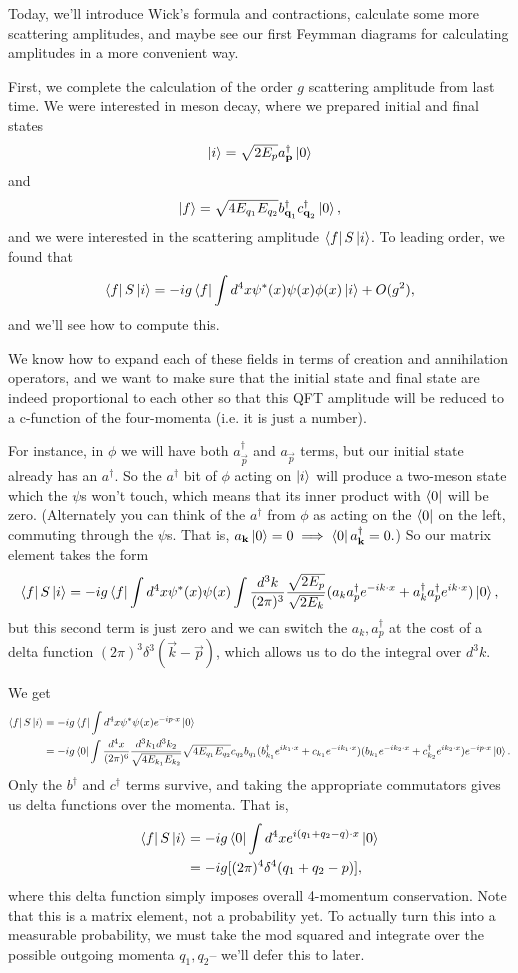 Today, we'll introduce Wick's formula and contractions, calculate some more scattering amplitudes, and maybe see our first Feymman diagrams for calculating amplitudes in a more convenient way.

First, we complete the calculation of the order $g$ scattering amplitude from last time. We were interested in meson decay, where we prepared initial and final states
$$\left| i \right>=\sqrt{2E_p}a_{\boldsymbol{\mathbf{p}}}^\dagger \left| 0 \right>$$
and
$$\left| f \right>=\sqrt{4E_{q_1}E_{q_2}}b_{\boldsymbol{\mathbf{q}}_1}^\dagger c_{\boldsymbol{\mathbf{q}}_2}^\dagger \left| 0 \right>,$$
and we were interested in the scattering amplitude $\left< f \right|S \left| i \right>$. To leading order, we found that
$$\left< f \right|S\left| i \right>=-ig \left< f \right|\int d^4 x \psi^* (x) \psi(x) \phi(x) \left| i \right> + O(g^2),$$
and we'll see how to compute this.

We know how to expand each of these fields in terms of creation and annihilation operators, and we want to make sure that the initial state and final state are indeed proportional to each other so that this QFT amplitude will be reduced to a c-function of the four-momenta (i.e. it is just a number). 

For instance, in $\phi$ we will have both $a_{\vec p}^\dagger$ and $a_{\vec p}$ terms, but our initial state already has an $a^\dagger$. So the $a^\dagger$ bit of $\phi$ acting on $\left| i \right>$ will produce a two-meson state which the $\psi$s won't touch, which means that its inner product with $\left< 0 \right|$ will be zero. (Alternately you can think of the $a^\dagger$ from $\phi$ as acting on the $\left< 0 \right|$ on the left, commuting through the $\psi$s. That is, $a_{\boldsymbol{\mathbf{k}}}\left| 0 \right>=0\implies \left< 0 \right| a_{\boldsymbol{\mathbf{k}}}^\dagger =0.$) So our matrix element takes the form
$$\left< f \right|S\left| i \right>=-ig \left< f \right| \int d^4x \psi^*(x) \psi(x)\int \frac{d^3k}{(2\pi)^3}\frac{\sqrt{2E_p}}{\sqrt{2E_k}}(a_k a_p^\dagger e^{-ik\cdot x}+a_k^\dagger a_p^\dagger e^{ik\cdot x})\left| 0 \right>,$$
but this second term is just zero and we can switch the $a_k, a_p^\dagger$ at the cost of a delta function $(2\pi)^3 \delta^3(\vec k -\vec p)$, which allows us to do the integral over $d^3k$.

We get
\begin{align*}
\left< f \right|S\left| i \right>&=-ig\left< f \right| \int d^4x \psi^* \psi(x)e^{-ip\cdot x}\left| 0 \right>\\
&=-ig \left< 0 \right| \int \frac{d^4x}{(2\pi)^6}\frac{d^3k_1 d^3k_2}{\sqrt{4E_{k_1}E_{k_2}}} \sqrt{4E_{q_1}E_{q_2}} c_{q_2}b_{q_1} (b_{k_1}^\dagger e^{ik_1\cdot x}+c_{k_1} e^{-ik_1 \cdot x})(b_{k_1} e^{-ik_2\cdot x}+c_{k_2}^\dagger e^{ik_2 \cdot x})e^{-ip\cdot x} \left| 0 \right>.
\end{align*}
Only the $b^\dagger$ and $c^\dagger$ terms survive, and taking the appropriate commutators gives us delta functions over the momenta. That is,
\begin{align*}
\left< f \right|S\left| i \right>&=-ig\left< 0 \right|\int d^4x e^{i(q_1+q_2-q)\cdot x}\left| 0 \right>\\
&=-ig[(2\pi)^4\delta^4(q_1+q_2-p)],
\end{align*}
where this delta function simply imposes overall 4-momentum conservation. Note that this is a matrix element, not a probability yet. To actually turn this into a measurable probability, we must take the mod squared and integrate over the possible outgoing momenta $q_1,q_2$-- we'll defer this to later.


